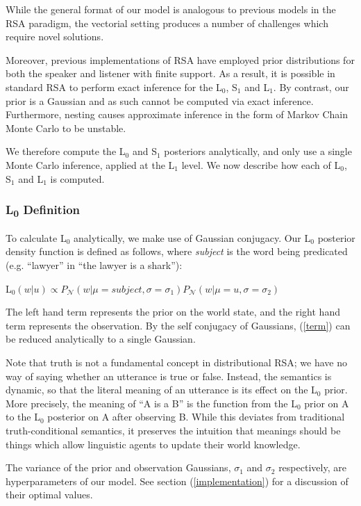 \documentclass[10pt,letterpaper,twocolumn]{article}
\begin{document}
While the general format of our model is analogous to previous models in the RSA paradigm, the vectorial setting produces a number of challenges which require novel solutions.

Moreover, previous implementations of RSA have employed prior distributions for both the speaker and listener with finite support. As a result, it is possible in standard RSA to perform exact inference for the L$_0$, S$_1$ and L$_1$. By contrast, our prior is a Gaussian and as such cannot be computed via exact inference. Furthermore, nesting causes approximate inference in the form of Markov Chain Monte Carlo to be unstable.


We therefore compute the L$_0$ and S$_1$ posteriors analytically, and only use a single Monte Carlo inference, applied at the L$_1$ level. We now describe how each of L$_0$, S$_1$ and L$_1$ is computed.

\subsubsection{L\textsubscript{0} Definition}

To calculate L$_0$ analytically, we make use of Gaussian conjugacy. Our L$_0$ posterior density function is defined as follows, where \emph{subject} is the word being predicated (e.g. ``lawyer'' in ``the lawyer is a shark''):

\begin{exe}
\ex L$_0(w\vert u) \propto P_{\mathcal{N}}(w\vert\mu=subject,\sigma=\sigma_1)P_{\mathcal{N}}(w\vert\mu=u,\sigma=\sigma_2)$ \label{term}
\end{exe}
The left hand term represents the prior on the world state, and the right hand term represents the observation. By the self conjugacy of Gaussians, (\ref{term}) can be reduced analytically to a single Gaussian.

Note that truth is not a fundamental concept in distributional RSA; we have no way of saying whether an utterance is true or false. Instead, the semantics is dynamic, so that the literal meaning of an utterance is its effect on the L$_0$ prior. More precisely, the meaning of ``A is a B'' is the function from the L$_0$ prior on A to the L$_0$ posterior on A after observing B. While this deviates from traditional truth-conditional semantics, it preserves the intuition that meanings should be things which allow linguistic agents to update their world knowledge. 

The variance of the prior and observation Gaussians, $\sigma_1$ and $\sigma_2$ respectively, are hyperparameters of our model. See section (\ref{implementation}) for a discussion of their optimal values.
\end{document}

